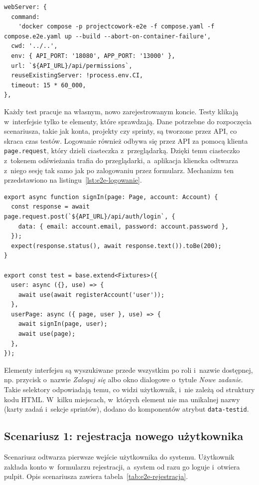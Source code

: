 \begin{lstlisting}[basicstyle=\footnotesize\ttfamily, captionpos=t, caption={Fragment konfiguracji \textit{Playwright} uruchamiającej system przed testami}, label={lst:e2e-konfiguracja}]
webServer: {
  command:
    'docker compose -p projectcowork-e2e -f compose.yaml -f compose.e2e.yaml up --build --abort-on-container-failure',
  cwd: '../..',
  env: { API_PORT: '18080', APP_PORT: '13000' },
  url: `${API_URL}/api/permissions`,
  reuseExistingServer: !process.env.CI,
  timeout: 15 * 60_000,
},
\end{lstlisting}

Każdy test pracuje na własnym, nowo zarejestrowanym koncie. Testy klikają w~interfejsie tylko te elementy, które
sprawdzają. Dane potrzebne do rozpoczęcia scenariusza, takie jak konta, projekty czy sprinty, są tworzone przez API,
co skraca czas testów. Logowanie również odbywa się przez API za pomocą klienta \texttt{page.request}, który dzieli
ciasteczka z~przeglądarką. Dzięki temu ciasteczko z~tokenem odświeżania trafia do przeglądarki, a~aplikacja kliencka
odtwarza z~niego sesję tak samo jak po zalogowaniu przez formularz. Mechanizm ten przedstawiono na listingu~\ref{lst:e2e-logowanie}.

\begin{lstlisting}[basicstyle=\footnotesize\ttfamily, captionpos=t, caption={Logowanie użytkownika testowego przez API}, label={lst:e2e-logowanie}]
export async function signIn(page: Page, account: Account) {
  const response = await page.request.post(`${API_URL}/api/auth/login`, {
    data: { email: account.email, password: account.password },
  });
  expect(response.status(), await response.text()).toBe(200);
}

export const test = base.extend<Fixtures>({
  user: async ({}, use) => {
    await use(await registerAccount('user'));
  },
  userPage: async ({ page, user }, use) => {
    await signIn(page, user);
    await use(page);
  },
});
\end{lstlisting}

Elementy interfejsu są wyszukiwane przede wszystkim po roli i~nazwie dostępnej, np. przycisk o~nazwie
\textit{Zaloguj się} albo okno dialogowe o~tytule \textit{Nowe zadanie}. Takie selektory odpowiadają temu, co widzi
użytkownik, i~nie zależą od struktury kodu HTML. W~kilku miejscach, w~których element nie ma unikalnej nazwy
(karty zadań i~sekcje sprintów), dodano do komponentów atrybut \texttt{data-testid}.

\subsection{Scenariusz 1: rejestracja nowego użytkownika}
Scenariusz odtwarza pierwsze wejście użytkownika do systemu. Użytkownik zakłada konto w~formularzu rejestracji, a~system
od razu go loguje i~otwiera pulpit. Opis scenariusza zawiera tabela~\ref{tab:e2e-rejestracja}.

